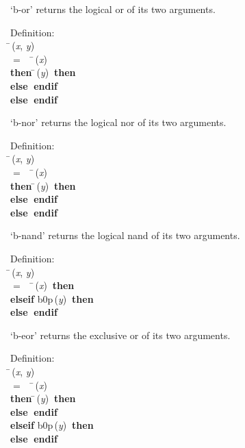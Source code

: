  `b-or' returns the logical or of its two arguments.
\begin{tabbing}{\sc Definition}: \\  
\=\,({\it{x\/}}, {\it{y\/}}) \\ 
$=$$\;\;\;\;$\=\,({\it{x\/}}) \\ 
{\bf then }\=\,({\it{y\/}})$\;\;${\bf then }{} \\ 
{\bf else }{}$\;${\bf  endif}\- \\ 
{\bf else }{}$\;${\bf  endif}\-\-
\end{tabbing}

 `b-nor' returns the logical nor of its two arguments.
\begin{tabbing}{\sc Definition}: \\  
\=\,({\it{x\/}}, {\it{y\/}}) \\ 
$=$$\;\;\;\;$\=\,({\it{x\/}}) \\ 
{\bf then }\=\,({\it{y\/}})$\;\;${\bf then }{} \\ 
{\bf else }{}$\;${\bf  endif}\- \\ 
{\bf else }{}$\;${\bf  endif}\-\-
\end{tabbing}

 `b-nand' returns the logical nand of its two arguments.
\begin{tabbing}{\sc Definition}: \\  
\=\,({\it{x\/}}, {\it{y\/}}) \\ 
$=$$\;\;\;\;$\=\,({\it{x\/}})$\;\;${\bf then }{} \\ 
{\bf elseif }{\rm{b0p}}\,({\it{y\/}})$\;\;${\bf then }{} \\ 
{\bf else }{}$\;${\bf  endif}\-\-
\end{tabbing}

 `b-eor' returns the exclusive or of its two arguments.
\begin{tabbing}{\sc Definition}: \\  
\=\,({\it{x\/}}, {\it{y\/}}) \\ 
$=$$\;\;\;\;$\=\,({\it{x\/}}) \\ 
{\bf then }\=\,({\it{y\/}})$\;\;${\bf then }{} \\ 
{\bf else }{}$\;${\bf  endif}\- \\ 
{\bf elseif }{\rm{b0p}}\,({\it{y\/}})$\;\;${\bf then }{} \\ 
{\bf else }{}$\;${\bf  endif}\-\-
\end{tabbing}

